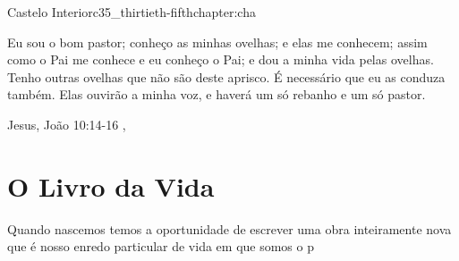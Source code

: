 \begin{chapterpage}{Castelo Interior}{c35_thirtieth-fifthchapter:cha}

\begin{myquotation}Eu sou o bom pastor; conheço as minhas ovelhas; e elas me conhecem;
assim como o Pai me conhece e eu conheço o Pai; e dou a minha vida pelas ovelhas.
Tenho outras ovelhas que não são deste aprisco. É necessário que eu as conduza também. Elas ouvirão a minha voz, e haverá um só rebanho e um só pastor.

\par\vspace*{15mm}
\mbox{}\hfill \emdash{}Jesus, João 10:14-16
, %
\par\end{myquotation}

\end{chapterpage}



\section{O Livro da Vida}\label{c1_basicformatting:sec}

\emdash{}Quando nascemos temos a oportunidade de escrever uma obra inteiramente nova que é nosso enredo particular de vida em que somos o p